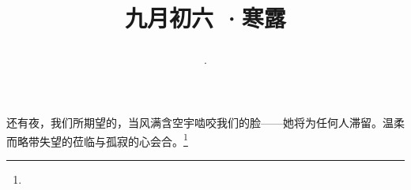 \title{\date[d=8,m=10,y=2024][year:cn-y,年,month:cn,day:cn,日,·,weekday]·九月初六 ·寒露}
还有夜，我们所期望的，当风满含空宇啮咬我们的脸——她将为任何人滞留。温柔而略带失望的莅临与孤寂的心会合。\footnote{ }

